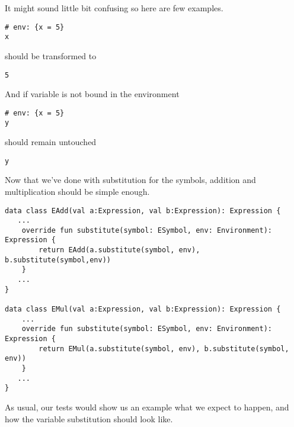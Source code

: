 \documentclass[11pt]{article}
\begin{document}
It might sound little bit confusing so here are few examples.

\begin{verbatim}
# env: {x = 5}
x
\end{verbatim}

should be transformed to

\begin{verbatim}
5
\end{verbatim}

And if variable is not bound in the environment
\begin{verbatim}
# env: {x = 5}
y
\end{verbatim}

should remain untouched
\begin{verbatim}
y
\end{verbatim}


Now that we've done with substitution for the symbols, addition and multiplication should be simple enough.

\begin{verbatim}
data class EAdd(val a:Expression, val b:Expression): Expression {
   ...
    override fun substitute(symbol: ESymbol, env: Environment): Expression {
        return EAdd(a.substitute(symbol, env), b.substitute(symbol,env))
    }
   ...
}

data class EMul(val a:Expression, val b:Expression): Expression {
    ...
    override fun substitute(symbol: ESymbol, env: Environment): Expression {
        return EMul(a.substitute(symbol, env), b.substitute(symbol, env))
    }
   ...
}

\end{verbatim}

As usual, our tests would show us an example what we expect to happen, and how the variable substitution should look like.
\end{document}
